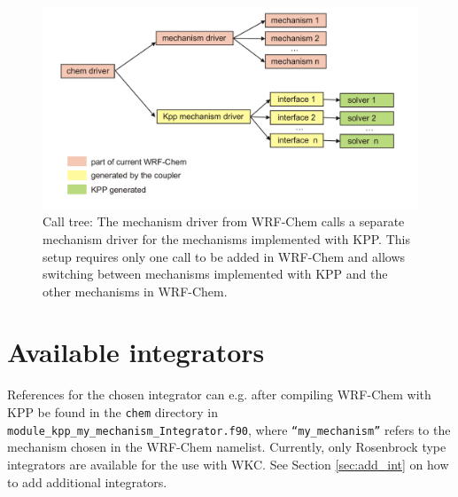 \documentclass[twoside, 12pt, letterpaper]{article}
\begin{document}
\begin{figure}[h]
  \begin{center}
  \includegraphics[width=14cm]{figs/mech_4}  
  \end{center}
  \caption{\label{fig:call} Call tree: The mechanism driver from WRF-Chem calls a separate mechanism driver for the mechanisms implemented with KPP. This setup requires only one call to be added in WRF-Chem and allows switching between mechanisms implemented with KPP and the other mechanisms in WRF-Chem.}
\end{figure} 








\section{Available integrators}

References for the chosen integrator can e.g. after compiling WRF-Chem with KPP  be found in the {\tt chem} directory in {\tt module\_kpp\_my\_mechanism\_Integrator.f90}, where {\tt ``my\_mechanism''} refers to the mechanism chosen in the WRF-Chem namelist. Currently, only Rosenbrock type integrators are available for the use with WKC. See Section \ref{sec:add_int} on how to add additional integrators.
\end{document}
